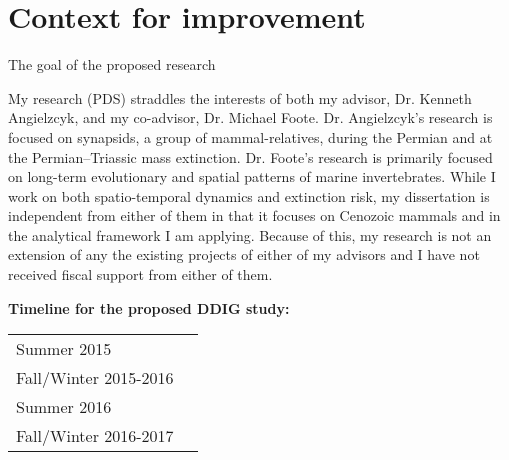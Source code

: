 \documentclass[11pt,letterpaper]{article}
\begin{document}
\setcounter{secnumdepth}{0}
\section{Context for improvement}



The goal of the proposed research

My research (PDS) straddles the interests of both my advisor, Dr. Kenneth Angielzcyk, and my co-advisor, Dr. Michael Foote. Dr. Angielzcyk's research is focused on synapsids, a group of mammal-relatives, during the Permian and at the Permian--Triassic mass extinction. Dr. Foote's research is primarily focused on long-term evolutionary and spatial patterns of marine invertebrates. While I work on both spatio-temporal dynamics and extinction risk, my dissertation is independent from either of them in that it focuses on Cenozoic mammals and in the analytical framework I am applying. Because of this, my research is not an extension of any the existing projects of either of my advisors and I have not received fiscal support from either of them.


\textbf{Timeline for the proposed DDIG study:}

\begin{tabular}[H]{l l}
  Summer 2015 & \\
  Fall/Winter 2015-2016 & \\
  Summer 2016 & \\
  Fall/Winter 2016-2017 & \\
\end{tabular}
\end{document}
